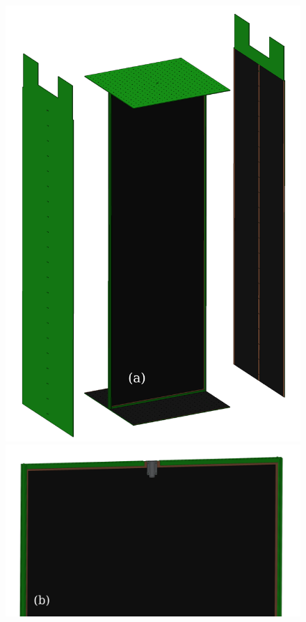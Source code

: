 \documentclass[a4paper,12pt]{article}
\begin{document}
\begin{figure}[htbp]
\centering
\begin{minipage}[b]{.4\textwidth}
	\includegraphics[width=\linewidth]{field_shell_design.PNG}
\end{minipage}
\qquad
\begin{minipage}[b]{.4\textwidth}
	\includegraphics[width=\linewidth]{field_shell_cathode_top.PNG}

\end{minipage}
\end{figure}
\end{document}
